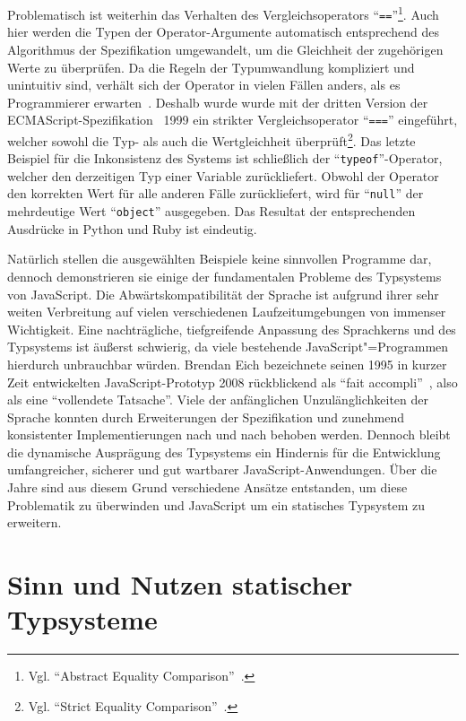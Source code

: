 Problematisch ist weiterhin das Verhalten des Vergleichsoperators \enquote{\texttt{==}}\footnote{Vgl. \enquote{Abstract Equality Comparison}~\autocite[Abschn. 7.2.14]{ECMASCRIPT:2019}.}. Auch hier werden die Typen der Operator-Argumente automatisch entsprechend des Algorithmus der Spezifikation umgewandelt, um die Gleichheit der zugehörigen Werte zu überprüfen. Da die Regeln der Typumwandlung kompliziert und unintuitiv sind, verhält sich der Operator in vielen Fällen anders, als es Programmierer erwarten~\autocite{PRADEL:2015}. Deshalb wurde wurde mit der dritten Version der ECMAScript-Spezifikation~\autocite{ECMASCRIPT:1999} 1999 ein strikter Vergleichsoperator \enquote{\texttt{===}} eingeführt, welcher sowohl die Typ- als auch die Wertgleichheit überprüft\footnote{Vgl. \enquote{Strict Equality Comparison}~\autocite[Abschn. 7.2.15]{ECMASCRIPT:2019}.}.
Das letzte Beispiel für die Inkonsistenz des Systems ist schließlich der \enquote{\texttt{typeof}}-Operator, welcher den derzeitigen Typ einer Variable zurückliefert. Obwohl der Operator den korrekten Wert für alle anderen Fälle zurückliefert, wird für \enquote{\texttt{null}} der mehrdeutige Wert \enquote{\texttt{object}} ausgegeben. Das Resultat der entsprechenden Ausdrücke in Python und Ruby ist eindeutig.

Natürlich stellen die ausgewählten Beispiele keine sinnvollen Programme dar, dennoch demonstrieren sie einige der fundamentalen Probleme des Typsystems von JavaScript. Die Abwärtskompatibilität der Sprache ist aufgrund ihrer sehr weiten Verbreitung auf vielen verschiedenen Laufzeitumgebungen von immenser Wichtigkeit. Eine nachträgliche, tiefgreifende Anpassung des Sprachkerns und des Typsystems ist äußerst schwierig, da viele bestehende JavaScript"=Programmen hierdurch unbrauchbar würden. Brendan Eich bezeichnete seinen 1995 in kurzer Zeit entwickelten JavaScript-Prototyp 2008 rückblickend als \enquote{fait accompli}~\autocite{EICH:POPULARITY}, also als eine \enquote{vollendete Tatsache}. Viele der anfänglichen Unzulänglichkeiten der Sprache konnten durch Erweiterungen der Spezifikation und zunehmend konsistenter Implementierungen nach und nach behoben werden. Dennoch bleibt die dynamische Ausprägung des Typsystems ein Hindernis für die Entwicklung umfangreicher, sicherer und gut wartbarer JavaScript-Anwendungen. Über die Jahre sind aus diesem Grund verschiedene Ansätze entstanden, um diese Problematik zu überwinden und JavaScript um ein statisches Typsystem zu erweitern.

\section{Sinn und Nutzen statischer Typsysteme}

